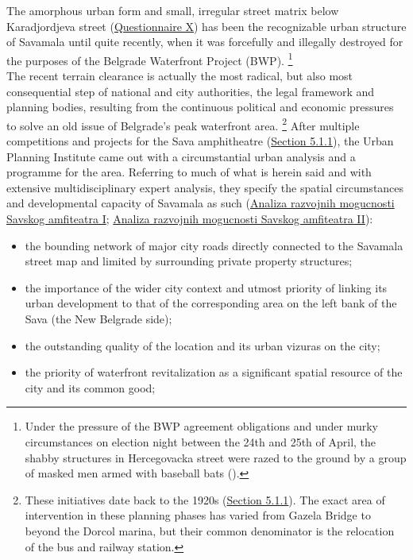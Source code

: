 \documentclass[11pt]{report}
\begin{document}
{{{{The amorphous urban form and small, irregular street matrix below Karadjordjeva street (\href{Questionnaire PhD students}{Questionnaire X}) has been the recognizable urban structure of Savamala until quite recently, when it was forcefully and illegally destroyed for the purposes of the Belgrade Waterfront Project (BWP).
\footnote{Under the pressure of the BWP agreement obligations and under murky circumstances on election night between the 24th and 25th of April, the shabby structures in Hercegovacka street were razed to the
ground by a group of masked men armed with baseball bats (\href{ref}{\citealt{popovic_porusili_2016}}).} %
\\

The recent terrain clearance is actually the most radical, but also most consequential step of national and city authorities, the legal framework and planning bodies, resulting from the continuous political and economic pressures to solve an old issue of Belgrade’s peak waterfront area. 
\footnote{These initiatives date back to the 1920s (\href{Section 5.1.1}{Section 5.1.1}).
The exact area of intervention in these planning phases has varied from Gazela Bridge to beyond the Dorcol marina, but their common denominator is the relocation of the bus and railway station.}
After multiple competitions and projects for the Sava amphitheatre  (\href{Section 5.1.1}{Section 5.1.1}), the Urban Planning Institute came out with a circumstantial urban analysis and a programme for the area. Referring to much of what is herein said and with extensive multidisciplinary expert analysis, they specify the spatial circumstances and developmental capacity of Savamala as such  
(\href{Program}{Analiza razvojnih mogucnosti Savskog amfiteatra I}; \href{Program}{Analiza razvojnih mogucnosti Savskog amfiteatra II}):

\begin{itemize}
\item the bounding network of major city roads directly connected to the Savamala street map and limited by surrounding private property structures;
\item the importance of the wider city context and utmost priority of linking its urban development to that of the corresponding area on the left bank of the Sava  (the New Belgrade side);
\item the outstanding quality of the location and its urban vizuras on the city;
\item the priority of waterfront revitalization as a significant spatial resource of the city and its common good;
\end{itemize}

}}}}
\end{document}
